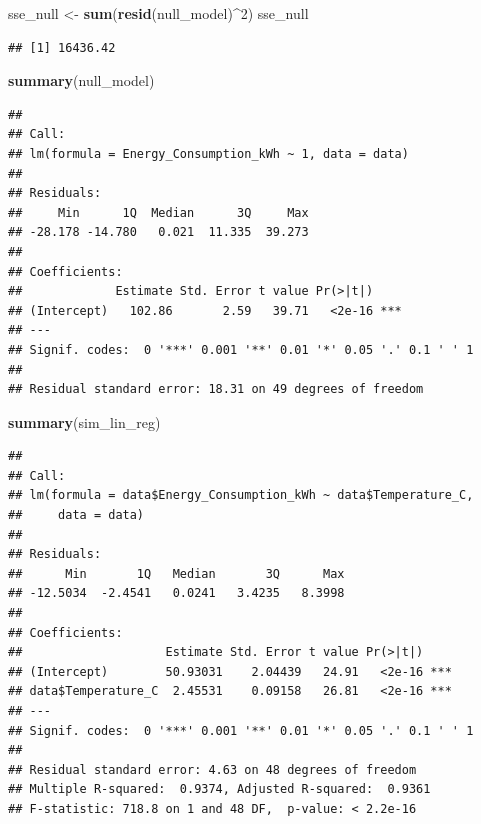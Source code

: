 \documentclass[
]{article}
\newenvironment{Shaded}{\begin{snugshade}}{\end{snugshade}}
\newcommand{\AttributeTok}[1]{\textcolor[rgb]{0.13,0.29,0.53}{#1}}
\newcommand{\DecValTok}[1]{\textcolor[rgb]{0.00,0.00,0.81}{#1}}
\newcommand{\FunctionTok}[1]{\textcolor[rgb]{0.13,0.29,0.53}{\textbf{#1}}}
\newcommand{\NormalTok}[1]{#1}
\newcommand{\OtherTok}[1]{\textcolor[rgb]{0.56,0.35,0.01}{#1}}
\newcommand{\SpecialCharTok}[1]{\textcolor[rgb]{0.81,0.36,0.00}{\textbf{#1}}}
\begin{document}
\begin{Shaded}
\begin{Highlighting}[]
\NormalTok{sse\_null }\OtherTok{\textless{}{-}} \FunctionTok{sum}\NormalTok{(}\FunctionTok{resid}\NormalTok{(null\_model)}\SpecialCharTok{\^{}}\DecValTok{2}\NormalTok{)}
\NormalTok{sse\_null}
\end{Highlighting}
\end{Shaded}

\begin{verbatim}
## [1] 16436.42
\end{verbatim}

\begin{Shaded}
\begin{Highlighting}[]
\FunctionTok{summary}\NormalTok{(null\_model)}
\end{Highlighting}
\end{Shaded}

\begin{verbatim}
## 
## Call:
## lm(formula = Energy_Consumption_kWh ~ 1, data = data)
## 
## Residuals:
##     Min      1Q  Median      3Q     Max 
## -28.178 -14.780   0.021  11.335  39.273 
## 
## Coefficients:
##             Estimate Std. Error t value Pr(>|t|)    
## (Intercept)   102.86       2.59   39.71   <2e-16 ***
## ---
## Signif. codes:  0 '***' 0.001 '**' 0.01 '*' 0.05 '.' 0.1 ' ' 1
## 
## Residual standard error: 18.31 on 49 degrees of freedom
\end{verbatim}

\begin{Shaded}
\end{Shaded}

\begin{Shaded}
\begin{Highlighting}[]
\FunctionTok{summary}\NormalTok{(sim\_lin\_reg)}
\end{Highlighting}
\end{Shaded}

\begin{verbatim}
## 
## Call:
## lm(formula = data$Energy_Consumption_kWh ~ data$Temperature_C, 
##     data = data)
## 
## Residuals:
##      Min       1Q   Median       3Q      Max 
## -12.5034  -2.4541   0.0241   3.4235   8.3998 
## 
## Coefficients:
##                    Estimate Std. Error t value Pr(>|t|)    
## (Intercept)        50.93031    2.04439   24.91   <2e-16 ***
## data$Temperature_C  2.45531    0.09158   26.81   <2e-16 ***
## ---
## Signif. codes:  0 '***' 0.001 '**' 0.01 '*' 0.05 '.' 0.1 ' ' 1
## 
## Residual standard error: 4.63 on 48 degrees of freedom
## Multiple R-squared:  0.9374, Adjusted R-squared:  0.9361 
## F-statistic: 718.8 on 1 and 48 DF,  p-value: < 2.2e-16
\end{verbatim}
\end{document}
